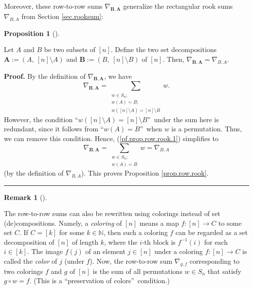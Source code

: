 \documentclass[numbers=enddot,12pt,final,onecolumn,notitlepage]{scrartcl}%
\numberwithin{exer}{subsection}
\theoremstyle{definition}
\newtheorem{prop}[theo]{Proposition}
\newenvironment{proposition}[1][]
{\begin{prop}[#1]\begin{leftbar}}
{\end{leftbar}\end{prop}}
\newtheorem{remk}[theo]{Remark}
\newenvironment{remark}[1][]
{\begin{remk}[#1]\begin{leftbar}}
{\end{leftbar}\end{remk}}
\newenvironment{proof}[1][Proof]{\noindent\textbf{#1.} }{\ \rule{0.5em}{0.5em}}
\let\sumnonlimits\sum
\renewcommand{\sum}{\sumnonlimits\limits}
\begin{document}
Moreover, these row-to-row sums $\nabla_{\mathbf{B},\mathbf{A}}$ generalize
the rectangular rook sums $\nabla_{B,A}$ from Section \ref{sec.rooksum}:

\begin{proposition}
\label{prop.row.rook}Let $A$ and $B$ be two subsets of $\left[  n\right]  $.
Define the two set decompositions $\mathbf{A}:=\left(  A,\ \left[  n\right]
\setminus A\right)  $ and $\mathbf{B}:=\left(  B,\ \left[  n\right]  \setminus
B\right)  $ of $\left[  n\right]  $. Then, $\nabla_{\mathbf{B},\mathbf{A}%
}=\nabla_{B,A}$.
\end{proposition}

\begin{proof}
By the definition of $\nabla_{\mathbf{B},\mathbf{A}}$, we have%
\begin{equation}
\nabla_{\mathbf{B},\mathbf{A}}=\sum_{\substack{w\in S_{n};\\w\left(  A\right)
=B;\\w\left(  \left[  n\right]  \setminus A\right)  =\left[  n\right]
\setminus B}}w. \label{pf.prop.row.rook.1}%
\end{equation}
However, the condition \textquotedblleft$w\left(  \left[  n\right]  \setminus
A\right)  =\left[  n\right]  \setminus B$\textquotedblright\ under the sum
here is redundant, since it follows from \textquotedblleft$w\left(  A\right)
=B$\textquotedblright\ when $w$ is a permutation. Thus, we can remove this
condition. Hence, (\ref{pf.prop.row.rook.1}) simplifies to%
\[
\nabla_{\mathbf{B},\mathbf{A}}=\sum_{\substack{w\in S_{n};\\w\left(  A\right)
=B}}w=\nabla_{B,A}%
\]
(by the definition of $\nabla_{B,A}$). This proves Proposition
\ref{prop.row.rook}.
\end{proof}

\begin{remark}
The row-to-row sums can also be rewritten using colorings instead of set
(de)compositions. Namely, a \emph{coloring} of $\left[  n\right]  $ means a
map $f:\left[  n\right]  \rightarrow C$ to some set $C$. If $C=\left[
k\right]  $ for some $k\in\mathbb{N}$, then such a coloring $f$ can be
regarded as a set decomposition of $\left[  n\right]  $ of length $k$, where
the $i$-th block is $f^{-1}\left(  i\right)  $ for each $i\in\left[  k\right]
$. The image $f\left(  j\right)  $ of an element $j\in\left[  n\right]  $
under a coloring $f:\left[  n\right]  \rightarrow C$ is called the
\emph{color} of $j$ (under $f$). Now, the row-to-row sum $\nabla_{g,f}$
corresponding to two colorings $f$ and $g$ of $\left[  n\right]  $ is the sum
of all permutations $w\in S_{n}$ that satisfy $g\circ w=f$. (This is a
\textquotedblleft preservation of colors\textquotedblright\ condition.)
\end{remark}
\end{document}
